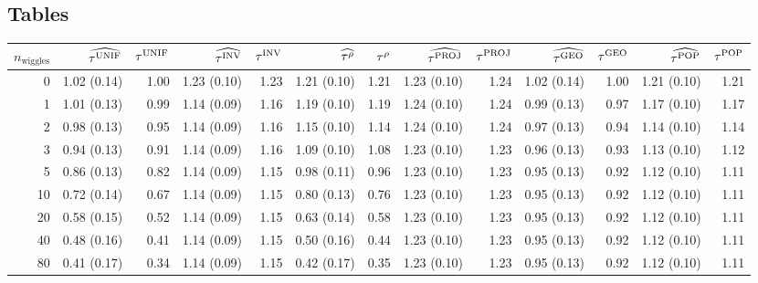 \documentclass[letter,12pt]{article}
\begin{document}
\begin{landscape}

\section{Tables}
\label{sec:tables}

    \begin{table}[!h]
        \begin{tabular}{r|rrrrrrrrrrrr}
            \hline
            $n_{\mathrm{wiggles}}$ & $\widehat{\tau^{\mathrm{UNIF}}}$ & $\tau^{\mathrm{UNIF}}$ & $\widehat{\tau^{\mathrm{INV}}}$ & $\tau^{\mathrm{INV}}$ & $\widehat{\tau^{\rho}}$ & $\tau^{\rho}$ & $\widehat{\tau^{\mathrm{PROJ}}}$ & $\tau^{\mathrm{PROJ}}$ & $\widehat{\tau^{\mathrm{GEO}}}$ & $\tau^{\mathrm{GEO}}$ & $\widehat{\tau^{\mathrm{POP}}}$ & $\tau^{\mathrm{POP}}$\\
            \hline
            0        & 1.02 (0.14) & 1.00    & 1.23 (0.10) & 1.23   & 1.21 (0.10) & 1.21   & 1.23 (0.10) & 1.24    & 1.02 (0.14) & 1.00   & 1.21 (0.10) & 1.21   \\
            1        & 1.01 (0.13) & 0.99    & 1.14 (0.09) & 1.16   & 1.19 (0.10) & 1.19   & 1.24 (0.10) & 1.24    & 0.99 (0.13) & 0.97   & 1.17 (0.10) & 1.17   \\
            2        & 0.98 (0.13) & 0.95    & 1.14 (0.09) & 1.16   & 1.15 (0.10) & 1.14   & 1.24 (0.10) & 1.24    & 0.97 (0.13) & 0.94   & 1.14 (0.10) & 1.14   \\
            3        & 0.94 (0.13) & 0.91    & 1.14 (0.09) & 1.16   & 1.09 (0.10) & 1.08   & 1.23 (0.10) & 1.23    & 0.96 (0.13) & 0.93   & 1.13 (0.10) & 1.12   \\
            5        & 0.86 (0.13) & 0.82    & 1.14 (0.09) & 1.15   & 0.98 (0.11) & 0.96   & 1.23 (0.10) & 1.23    & 0.95 (0.13) & 0.92   & 1.12 (0.10) & 1.11   \\
            10       & 0.72 (0.14) & 0.67    & 1.14 (0.09) & 1.15   & 0.80 (0.13) & 0.76   & 1.23 (0.10) & 1.23    & 0.95 (0.13) & 0.92   & 1.12 (0.10) & 1.11   \\
            20       & 0.58 (0.15) & 0.52    & 1.14 (0.09) & 1.15   & 0.63 (0.14) & 0.58   & 1.23 (0.10) & 1.23    & 0.95 (0.13) & 0.92   & 1.12 (0.10) & 1.11   \\
            40       & 0.48 (0.16) & 0.41    & 1.14 (0.09) & 1.15   & 0.50 (0.16) & 0.44   & 1.23 (0.10) & 1.23    & 0.95 (0.13) & 0.92   & 1.12 (0.10) & 1.11   \\
            80       & 0.41 (0.17) & 0.34    & 1.14 (0.09) & 1.15   & 0.42 (0.17) & 0.35   & 1.23 (0.10) & 1.23    & 0.95 (0.13) & 0.92   & 1.12 (0.10) & 1.11   \\

\end{tabular}
\end{table}
\end{landscape}
\end{document}
